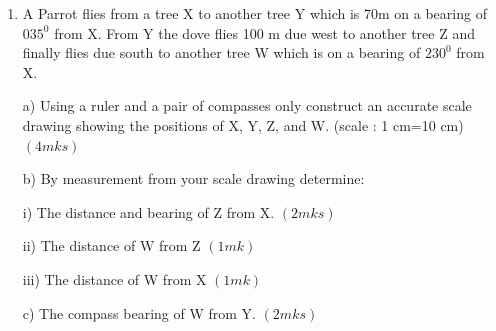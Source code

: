 \documentclass[
  a4paperpaper,
]{scrbook}
\begin{document}
\begin{tcolorbox}
\begin{enumerate}
\def\labelenumi{\arabic{enumi}.}
\setcounter{enumi}{20}
\item
  A Parrot flies from a tree X to another tree Y which is 70m on a
  bearing of \(035^0\) from X. From Y the dove flies 100 m due west to
  another tree Z and finally flies due south to another tree W which is
  on a bearing of \(230^0\) from X.

  a) Using a ruler and a pair of compasses only construct an accurate
  scale drawing showing the positions of X, Y, Z, and W. (scale : 1
  cm=10 cm) \((4mks)\)

  b) By measurement from your scale drawing determine:

  i) The distance and bearing of Z from X. \((2mks)\)

  ii) The distance of W from Z \((1mk)\)

  iii) The distance of W from X \((1mk)\)

  c) The compass bearing of W from Y. \((2mks)\)
\end{enumerate}

\end{tcolorbox}
\end{document}
